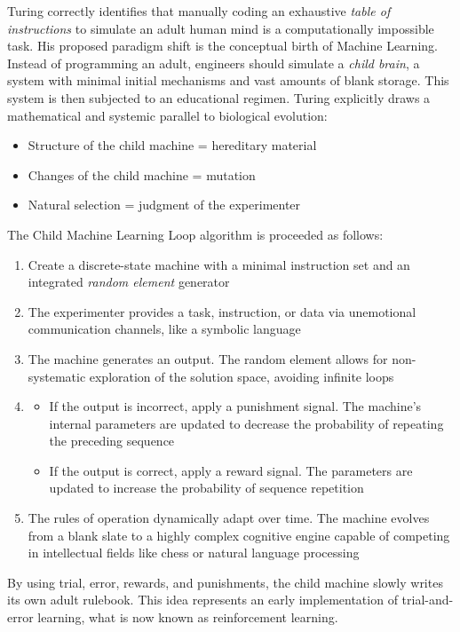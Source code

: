  Turing correctly identifies that manually coding an exhaustive \textit{table of instructions} to simulate an adult human mind is a computationally impossible task. His proposed paradigm shift is the conceptual birth of Machine Learning.
 Instead of programming an adult, engineers should simulate a \textit{child brain}, a system with minimal initial mechanisms and vast amounts of blank storage. This system is then subjected to an educational regimen. Turing explicitly draws a mathematical and systemic parallel to biological evolution:
 \begin{itemize}
 	\item Structure of the child machine = hereditary material
 	\item Changes of the child machine = mutation
 	\item Natural selection = judgment of the experimenter
 \end{itemize}
 The Child Machine Learning Loop algorithm is proceeded as follows:
 \begin{enumerate}
 	\item Create a discrete-state machine with a minimal instruction set and an integrated \textit{random element} generator
 	\item The experimenter provides a task, instruction, or data via unemotional communication channels, like a symbolic language
 	\item The machine generates an output. The random element allows for non-systematic exploration of the solution space, avoiding infinite loops
 	\item
 	\begin{itemize}
 		\item If the output is incorrect, apply a punishment signal. The machine's internal parameters are updated to decrease the probability of repeating the preceding sequence
 		\item If the output is correct, apply a reward signal. The parameters are updated to increase the probability of sequence repetition
 	\end{itemize}
 	\item The rules of operation dynamically adapt over time. The machine evolves from a blank slate to a highly complex cognitive engine capable of competing in intellectual fields like chess or natural language processing
 \end{enumerate}
 
 By using trial, error, rewards, and punishments, the child machine slowly writes its own adult rulebook. This idea represents an early implementation of trial-and-error learning, what is now known as reinforcement learning.
 
